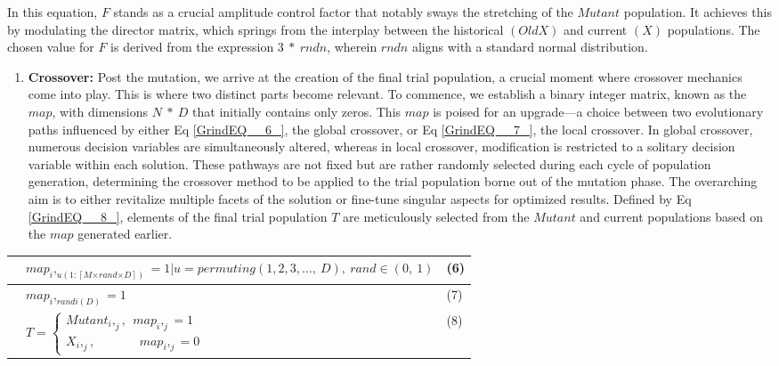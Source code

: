 \documentclass{article} %
\begin{document}
In this equation, $F$ stands as a crucial amplitude control factor that notably sways the stretching of the $Mutant$ population. It achieves this by modulating the director matrix, which springs from the interplay between the historical $(OldX)$ and current $(X)$ populations. The chosen value for $F$ is derived from the expression $3\ *\ rndn$, wherein $rndn$ aligns with a standard normal distribution.

\begin{enumerate}
\item  \textbf{Crossover:} Post the mutation, we arrive at the creation of the final trial population, a crucial moment where crossover mechanics come into play. This is where two distinct parts become relevant. To commence, we establish a binary integer matrix, known as the $map$, with dimensions $N\ *\ D$ that initially contains only zeros. This $map$ is poised for an upgrade---a choice between two evolutionary paths influenced by either Eq \eqref{GrindEQ__6_}, the global crossover, or Eq \eqref{GrindEQ__7_}, the local crossover. In global crossover, numerous decision variables are simultaneously altered, whereas in local crossover, modification is restricted to a solitary decision variable within each solution. These pathways are not fixed but are rather randomly selected during each cycle of population generation, determining the crossover method to be applied to the trial population borne out of the mutation phase. The overarching aim is to either revitalize multiple facets of the solution or fine-tune singular aspects for optimized results. Defined by Eq \eqref{GrindEQ__8_}, elements of the final trial population $T$ are meticulously selected from the $Mutant$ and current populations based on the $map$ generated earlier.
\end{enumerate}

\begin{tabular}{|p{0.3in}|p{3.2in}|p{0.4in}|} \hline 
 & $map_i,_{u\left(1:\left\lceil M\mathrm{\times }rand\mathrm{\times }D\right\rceil \right)}=1\mathrm{\mid }u=permuting\left(1,2,3,\dots ,\ D\right),\ rand\in \left(0,\ 1\right)$ & (6) \\ \hline 
 & $map_i,_{randi\left(D\right)}=1$ & (7) \\ \hline 
 & $T\mathrm{=}\left\{ \begin{array}{c}
Mutant_i,_j\mathrm{,\ \ }map_i,_j=1 \\ 
X_i,_j\mathrm{,\ \ \ \ \ \ \ \ \ \ \ \ \ \ \ \ }map_i,_j=0 \end{array}
\right.$ & (8) \\ \hline 
\end{tabular}
\end{document}
